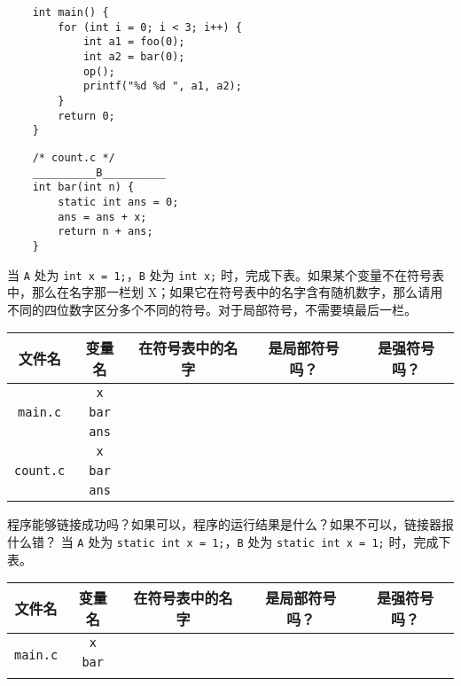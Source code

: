 \begin{problems}
\begin{verbatim}
    int main() {
        for (int i = 0; i < 3; i++) {
            int a1 = foo(0);
            int a2 = bar(0);
            op();
            printf("%d %d ", a1, a2);
        } 
        return 0;
    }
        \end{verbatim}
        \begin{verbatim}
    /* count.c */
    __________B__________
    int bar(int n) {
        static int ans = 0;
        ans = ans + x;
        return n + ans;
    }
        \end{verbatim}
        \qn 当 \verb|A| 处为 \verb|int x = 1;|，\verb|B| 处为 \verb|int x;| 时，完成下表。如果某个变量不在符号表中，那么在名字那一栏划 X；如果它在符号表中的名字含有随机数字，那么请用不同的四位数字区分多个不同的符号。对于局部符号，不需要填最后一栏。
        \begin{table}[H]
            \centering
            \begin{tabular}{|c|c|c|c|c|}
                \hline
                文件名 & 变量名 & 在符号表中的名字 & 是局部符号吗？ & 是强符号吗？ \\ \hline
                \multirow{3}{*}{\texttt{main.c}} & \texttt{x} &  &  &  \\ \cline{2-5} 
                & \texttt{bar} &  &  &  \\ \cline{2-5} 
                & \texttt{ans} &  &  &  \\ \hline
                \multirow{3}{*}{\texttt{count.c}} & \texttt{x} &  &  &  \\ \cline{2-5} 
                & \texttt{bar} &  &  &  \\ \cline{2-5} 
                & \texttt{ans} &  &  &  \\ \hline
            \end{tabular}
        \end{table}
        程序能够链接成功吗？如果可以，程序的运行结果是什么？如果不可以，链接器报什么错？
        \qn 当 \verb|A| 处为 \verb|static int x = 1;|，\verb|B| 处为 \verb|static int x = 1;| 时，完成下表。
        \begin{table}[H]
            \centering
            \begin{tabular}{|c|c|c|c|c|}
                \hline
                文件名 & 变量名 & 在符号表中的名字 & 是局部符号吗？ & 是强符号吗？ \\ \hline
                \multirow{3}{*}{\texttt{main.c}} & \texttt{x} &  &  &  \\ \cline{2-5} 
                & \texttt{bar} &  &  &  \\ \cline{2-5} 

\end{tabular}
\end{table}
\end{problems}
